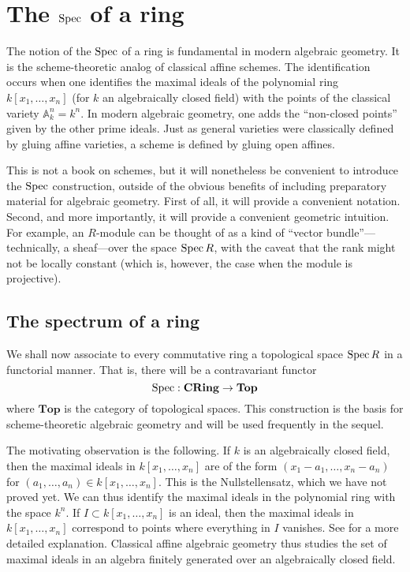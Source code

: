 \chapter{The $\operatorname{Spec}$ of a ring}
\label{spec}

The notion of the $\operatorname{Spec}$ of a ring is fundamental in modern
algebraic
geometry. It is the scheme-theoretic analog of classical affine
schemes. The
identification occurs when one identifies the maximal ideals of
the polynomial
ring $k[x_1, \dots, x_n]$ (for $k$ an algebraically closed
field) with the
points of the classical variety $\mathbb{A}^n_k = k^n$. In
modern algebraic
geometry, one adds the ``non-closed points'' given by the other
prime ideals.
Just as general varieties were classically defined by gluing
affine varieties, a
scheme is defined by gluing open affines. 

This is not a book on schemes, but it will nonetheless be
convenient to introduce the $\operatorname{Spec}$ construction, outside of the obvious
benefits of including preparatory material for algebraic geometry. First of
all, it will provide a convenient
notation. Second, and more importantly, it will provide a
convenient geometric
intuition. For example, an $R$-module can be thought of as a
kind of ``vector
bundle''---technically, a sheaf---over the space $\operatorname{Spec} R$, with
the caveat
that the rank might not be locally constant (which is, however,
the case when the module
is projective).

\section{The spectrum of a ring}

We shall now associate to every commutative ring a topological
space $\operatorname{Spec} R$
in a functorial manner.
That is, there will be a contravariant functor
\[\operatorname{Spec}:  \mathbf{CRing} \to \mathbf{Top}  \]
where $\mathbf{Top}$ is the category of topological spaces.
This construction is the basis for scheme-theoretic
algebraic geometry and will be used frequently in the sequel. 

The motivating observation is the following. If $k$ is an algebraically closed
field, then the maximal ideals in $k[x_1, \dots, x_n]$ are of the form
$(x_1-a_1, \dots, x_n  - a_n)$ for $(a_1, \dots, a_n) \in k[x_1, \dots, x_n]$.
This is the Nullstellensatz, which we have not proved yet. We can thus
identify the maximal ideals in the polynomial ring with the space $k^n$.
If $I \subset k[x_1, \dots, x_n]$ is an ideal, then the maximal ideals in
$k[x_1,\dots,x_n]$ correspond to points where everything in $I$ vanishes. See 
 for a more detailed explanation. Classical affine algebraic
geometry thus studies the set of maximal ideals in an algebra finitely
generated over an algebraically closed field.

